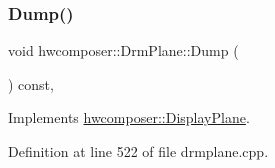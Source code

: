 \subsubsection{\texorpdfstring{Dump()}{Dump()}}
{\footnotesize\ttfamily void hwcomposer\+::\+Drm\+Plane\+::\+Dump (\begin{DoxyParamCaption}{ }\end{DoxyParamCaption}) const\hspace{0.3cm}{\ttfamily [override]}, {\ttfamily [virtual]}}



Implements \mbox{\hyperlink{classhwcomposer_1_1DisplayPlane_a3754165ab1101fba4229b842c7f14556}{hwcomposer\+::\+Display\+Plane}}.



Definition at line 522 of file drmplane.\+cpp.


